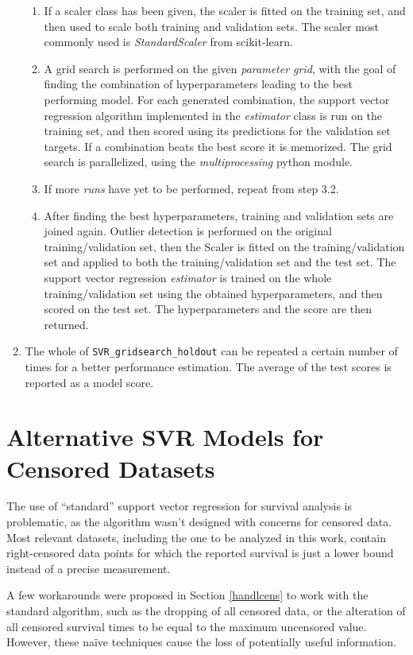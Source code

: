 \documentclass[12pt]{report}
\begin{document}
\begin{enumerate}
\begin{enumerate}
\item If a scaler class has been given, the scaler is fitted on the training set, and then used to scale both training and validation sets. The scaler most commonly used is \textit{StandardScaler} from scikit-learn.
\item A grid search is performed on the given \textit{parameter grid}, with the goal of finding the combination of hyperparameters leading to the best performing model. For each generated combination, the support vector regression algorithm implemented in the \textit{estimator} class is run on the training set, and then scored using its predictions for the validation set targets. If a combination beats the best score it is memorized. The grid search is parallelized, using the \textit{multiprocessing} python module.
\item If more \textit{runs} have yet to be performed, repeat from step 3.2.
\item After finding the best hyperparameters, training and validation sets are joined again. Outlier detection is performed on the original training/validation set, then the Scaler is fitted on the training/validation set and applied to both the training/validation set and the test set. The support vector regression \textit{estimator} is trained on the whole training/validation set using the obtained hyperparameters, and then scored on the test set. The hyperparameters and the score are then returned.
\end{enumerate}
\item The whole of \texttt{SVR\_gridsearch\_holdout} can be repeated a certain number of times for a better performance estimation. The average of the test scores is reported as a model score.
\end{enumerate}

\chapter{Alternative SVR Models for Censored Datasets}
\label{chaltsvr}
The use of ``standard'' support vector regression for survival analysis is problematic, as the algorithm wasn't designed with concerns for censored data. Most relevant datasets, including the one to be analyzed in this work, contain right-censored data points for which the reported survival is just a lower bound instead of a precise measurement.

A few workarounds were proposed in Section \ref{handlcens} to work with the standard algorithm, such as the dropping of all censored data, or the alteration of all censored survival times to be equal to the maximum uncensored value. However, these naïve techniques cause the loss of potentially useful information.
\end{document}
